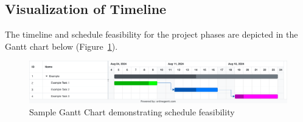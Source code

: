 \subsection{Visualization of Timeline}
The timeline and schedule feasibility for the project phases are depicted in the Gantt chart below (Figure~\ref{fig:gantt-chart}).

\begin{figure}[H]
    \centering
    \includegraphics[width=1\linewidth]{Images/gantt.png}
    \caption{Sample Gantt Chart demonstrating schedule feasibility}
    \label{fig:gantt-chart}
\end{figure}
